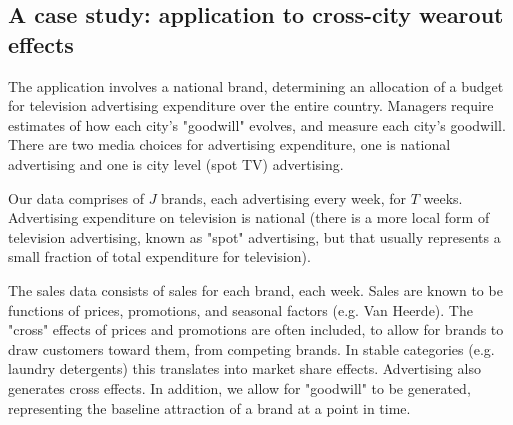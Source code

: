 \documentclass[11pt]{article} %
\begin{document}
\subsection{A case study: application to cross-city wearout effects}

The application involves a national brand, determining an allocation of a budget for television advertising expenditure over
the entire country.  Managers require estimates of how each city's "goodwill" evolves, and measure each city's goodwill.  
There are two media choices for advertising expenditure, one is national advertising and one is city level (spot TV) advertising.

Our data comprises of $J$ brands, each advertising every week, for $T$ weeks.  Advertising expenditure
on television is national (there is a more local form of television advertising, known as "spot" advertising, 
but that usually represents a small fraction of total expenditure for television).  

The sales data consists of sales for each brand, each week.  Sales are known to be functions of prices, 
promotions, and seasonal factors (e.g. Van Heerde).  The "cross" effects of prices and promotions are often
included, to allow for brands to draw customers toward them, from competing brands.   In stable categories (e.g. laundry detergents) this translates into market share effects.  Advertising also generates cross effects.  In addition, we allow for "goodwill" to be generated, representing the baseline attraction of a brand at a point in time.  
\end{document}
